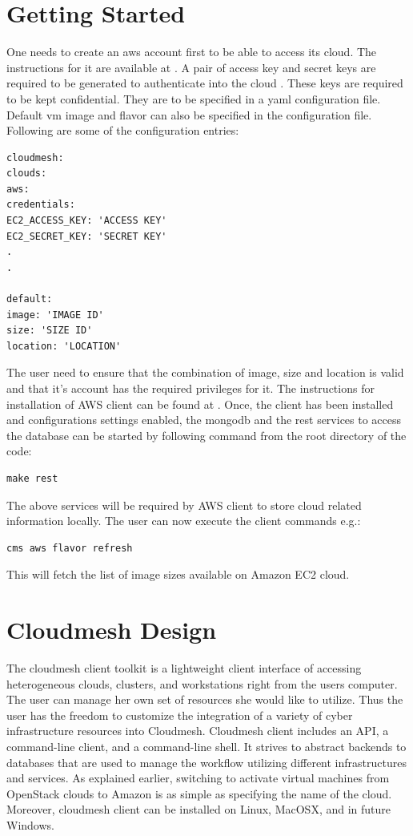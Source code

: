 \documentclass[9pt,twocolumn,twoside]{../../styles/osajnl}
\begin{document}
\section{Getting Started}

One needs to create an aws account first to be able to access its cloud. The instructions for it are available at \cite{www-amazon-aws}. A pair of access key and secret keys are required to be generated to authenticate into the cloud \cite{www-amazon-key}. These keys are required to be kept confidential. They are to be specified in a yaml configuration file. Default vm image and flavor can also be specified in the configuration file. Following are some of the configuration entries:

\begin{verbatim} 
cloudmesh:
clouds:
aws:
credentials:
EC2_ACCESS_KEY: 'ACCESS KEY'
EC2_SECRET_KEY: 'SECRET KEY'
.
.

default:
image: 'IMAGE ID'
size: 'SIZE ID'
location: 'LOCATION'

\end{verbatim}

The user need to ensure that the combination of image, size and location is valid and that it's account has the required privileges for it. The instructions for installation of AWS client can be found at \cite{www-cloudmesh-aws}. Once, the client has been installed and configurations settings enabled, the mongodb and the rest services to access the database can be started by following command from the root directory of the code:

\begin{verbatim}
make rest
\end{verbatim}

The above services will be required by AWS client to store cloud related information locally. The user can now execute the client commands e.g.:

\begin{verbatim}
cms aws flavor refresh
\end{verbatim}

This will fetch the list of image sizes available on Amazon EC2 cloud.

\section{Cloudmesh Design}
\label{S:cmclient}

The cloudmesh client toolkit \cite{www-cloudmesh-client} is a
lightweight client interface of accessing heterogeneous clouds,
clusters, and workstations right from the users computer. The user can
manage her own set of resources she would like to utilize. Thus the
user has the freedom to customize the integration of a variety of
cyber infrastructure resources into Cloudmesh. Cloudmesh client
includes an API, a command-line client, and a command-line shell. It
strives to abstract backends to databases that are used to manage the
workflow utilizing different infrastructures and services. As
explained earlier, switching to activate virtual machines from
OpenStack clouds to Amazon is as simple as specifying the name of the
cloud. Moreover, cloudmesh client can be installed on Linux, MacOSX,
and in future Windows.
\end{document}
